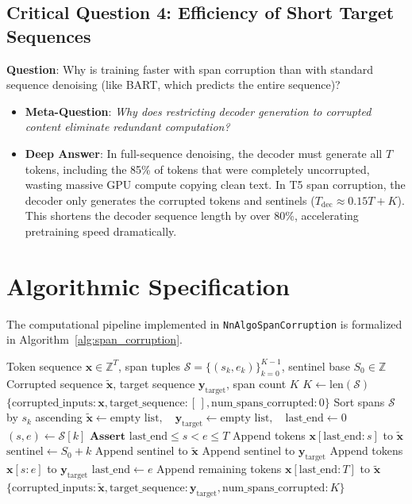 \documentclass[11pt,a4paper]{article}
\theoremstyle{definition}
\begin{document}
\subsection{\textbf{Critical Question 4: Efficiency of Short Target Sequences}}
\textbf{Question}: Why is training faster with span corruption than with standard sequence denoising (like BART, which predicts the entire sequence)?
\begin{itemize}
    \item \textbf{Meta-Question}: \emph{Why does restricting decoder generation to corrupted content eliminate redundant computation?}
    \item \textbf{Deep Answer}: In full-sequence denoising, the decoder must generate all $T$ tokens, including the 85\% of tokens that were completely uncorrupted, wasting massive GPU compute copying clean text. In T5 span corruption, the decoder only generates the corrupted tokens and sentinels ($T_{\text{dec}} \approx 0.15 T + K$). This shortens the decoder sequence length by over 80\%, accelerating pretraining speed dramatically.
\end{itemize}

\section{Algorithmic Specification}

The computational pipeline implemented in \texttt{NnAlgoSpanCorruption} is formalized in Algorithm~\ref{alg:span_corruption}.

\begin{algorithm}[H]
\caption{Span Corruption Pipeline}
\label{alg:span_corruption}
\begin{algorithmic}[1]
\Require Token sequence $\mathbf{x} \in \mathbb{Z}^T$, span tuples $\mathcal{S} = \{(s_k, e_k)\}_{k=0}^{K-1}$, sentinel base $S_0 \in \mathbb{Z}$
\Ensure Corrupted sequence $\tilde{\mathbf{x}}$, target sequence $\mathbf{y}_{\text{target}}$, span count $K$
\State $K \gets \text{len}(\mathcal{S})$
    \State \Return $\{\text{corrupted\_inputs}: \mathbf{x}, \text{target\_sequence}: [\,], \text{num\_spans\_corrupted}: 0\}$
\EndIf
\State Sort spans $\mathcal{S}$ by $s_k$ ascending
\State $\tilde{\mathbf{x}} \gets \text{empty list}, \quad \mathbf{y}_{\text{target}} \gets \text{empty list}, \quad \text{last\_end} \gets 0$
    \State $(s, e) \gets \mathcal{S}[k]$
    \State $\textbf{Assert } \text{last\_end} \le s < e \le T$ 
    \State Append tokens $\mathbf{x}[\text{last\_end}:s]$ to $\tilde{\mathbf{x}}$
    \State $\text{sentinel} \gets S_0 + k$
    \State Append $\text{sentinel}$ to $\tilde{\mathbf{x}}$
    \State Append $\text{sentinel}$ to $\mathbf{y}_{\text{target}}$
    \State Append tokens $\mathbf{x}[s:e]$ to $\mathbf{y}_{\text{target}}$
    \State $\text{last\_end} \gets e$
\EndFor
\State Append remaining tokens $\mathbf{x}[\text{last\_end}:T]$ to $\tilde{\mathbf{x}}$
\State \Return $\{\text{corrupted\_inputs}: \tilde{\mathbf{x}}, \text{target\_sequence}: \mathbf{y}_{\text{target}}, \text{num\_spans\_corrupted}: K\}$
\end{algorithmic}
\end{algorithm}
\end{document}
